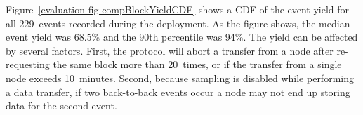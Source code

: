 Figure~\ref{evaluation-fig-compBlockYieldCDF} shows a CDF of the event yield
for all 229~events recorded during the deployment.  As the figure shows, the
median event yield was 68.5\% and the 90th percentile was 94\%.  The yield
can be affected by several factors.  First, the protocol will abort a
transfer from a node after re-requesting the same block more than 20~times,
or if the transfer from a single node exceeds 10~minutes.  Second, because
sampling is disabled while performing a data transfer, if two back-to-back
events occur a node may not end up storing data for the second event.






